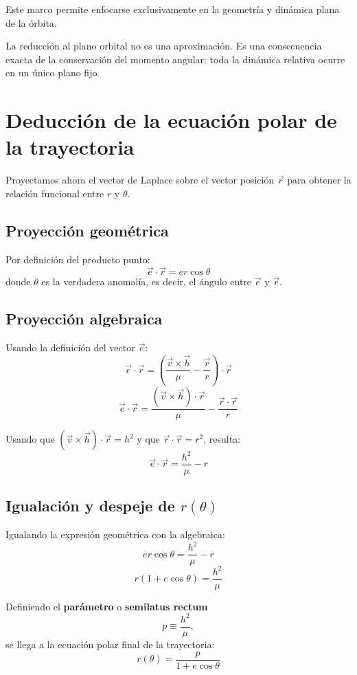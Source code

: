 Este marco permite enfocarse exclusivamente en la geometría y dinámica plana de la órbita.

\begin{importante}
La reducción al plano orbital no es una aproximación. Es una consecuencia exacta de la conservación del momento angular: toda la dinámica relativa ocurre en un único plano fijo.
\end{importante}

\section{Deducción de la ecuación polar de la trayectoria}
Proyectamos ahora el vector de Laplace sobre el vector posición \(\vec{r}\) para obtener la relación funcional entre \(r\) y \(\theta\).

\subsection{Proyección geométrica}
Por definición del producto punto:
\[
\vec{e} \cdot \vec{r} = e r \cos\theta
\]
donde \(\theta\) es la verdadera anomalía, es decir, el ángulo entre \(\vec{e}\) y \(\vec{r}\).

\subsection{Proyección algebraica}
Usando la definición del vector \(\vec{e}\):
\[
\vec{e} \cdot \vec{r} = \left(\frac{\vec{v} \times \vec{h}}{\mu} - \frac{\vec{r}}{r}\right) \cdot \vec{r}
\]
\[
\vec{e} \cdot \vec{r} = \frac{(\vec{v} \times \vec{h}) \cdot \vec{r}}{\mu} - \frac{\vec{r} \cdot \vec{r}}{r}
\]

Usando que \((\vec{v} \times \vec{h}) \cdot \vec{r} = h^2\) y que \(\vec{r} \cdot \vec{r} = r^2\), resulta:
\[
\vec{e} \cdot \vec{r} = \frac{h^2}{\mu} - r
\]

\subsection{Igualación y despeje de \texorpdfstring{$r(\theta)$}{r(theta)}}
Igualando la expresión geométrica con la algebraica:
\[
 e r \cos\theta = \frac{h^2}{\mu} - r
\]
\[
 r(1 + e\cos\theta) = \frac{h^2}{\mu}
\]

Definiendo el \textbf{parámetro} o \textbf{semilatus rectum}
\[
 p \equiv \frac{h^2}{\mu},
\]
se llega a la ecuación polar final de la trayectoria:
\[
\boxed{r(\theta) = \frac{p}{1 + e\cos\theta}}
\]


